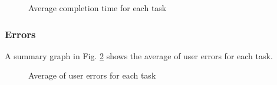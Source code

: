     \begin{figure}[!ht]
        \begin{minipage}{\linewidth}
            \centering
            \captionsetup{justification=centering}
            \caption{Average completion time for each task}
            \label{ResultsEfficiencyAvg}
        \end{minipage}
    \end{figure}

\pagebreak

\subsubsection{Errors}
    A summary graph in Fig. \ref{BarsErrors} shows the average of user errors for each task.
    \begin{figure}[!ht]
        \begin{minipage}{\linewidth}
            \centering
            \captionsetup{justification=centering}
            \caption{Average of user errors for each task}
            \label{BarsErrors}
        \end{minipage}
    \end{figure}


